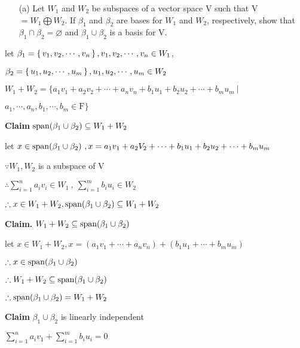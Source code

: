 \begin{enumerate}
	\item[(a)] Let $W_1$ and $W_2$ be subspaces of a vector space V such that V $= W_1 \bigoplus W_2$. If $\beta_{1}$ and $\beta_{2}$ are bases for $W_1$ and $W_2$, respectively, show that $\beta_1 \cap \beta_2 = \varnothing$ and $\beta_1 \cup \beta_2$ is a basis for V.
\end{enumerate}

\begin{tcolorbox}
	\begin{solution}
		let $\beta_1 = \left\{ \,v_1,v_2,\cdots,v_n \,\right\},v_1,v_2,\cdots,v_n \in W_1$,
		
		 $\beta_2 = \left\{ \,u_1,u_2,\cdots,u_m \,\right\},u_1,u_2,\cdots,u_m \in W_2$
		
		$W_1 + W_2 = \{a_1v_1+a_2v_2+\cdots+a_nv_n+b_1u_1+b_2u_2+\cdots+b_mu_m ~|~  $ 
		
		$a_1,\cdots,a_n,b_1,\cdots,b_m \in \mathrm{F}\} $
		
		\textbf{Claim} $\text{span($\beta_1 \cup \beta_2$)} \subseteq W_1 + W_2$
		
		let $x \in \text{span($\beta_1 \cup \beta_2$)}~, x = a_1v_1 + a_2V_2 + \cdots + b_1u_1 + b_2u_2 + \cdots + b_mu_m$
		
		$\because W_1,W_2$ is a subspace of V
		
		$\therefore \sum^{n}_{i=1}a_iv_i \in W_1~,~ \sum^{m}_{i=1}b_iu_i \in W_2$
		
		$\therefore x \in W_1 + W_2,\text{span($\beta_1 \cup \beta_2$)} \subseteq W_1 + W_2$
		
		\textbf{Claim.} $W_1 + W_2 \subseteq \text{span($\beta_1 \cup \beta_2$)}$
		
		let $x \in W_1 + W_2, x = (a_1v_1 + \cdots + a_nv_n) + (b_1u_1 + \cdots  + b_mu_m)$
		
		$\therefore x \in \text{span($\beta_1 \cup \beta_2$)}$
		
		$\therefore W_1 + W_2 \subseteq \text{span($\beta_1 \cup \beta_2$)}$
		
		$\therefore \text{span($\beta_1 \cup \beta_2$)} = W_1 + W_2$


		\textbf{Claim} ${\beta_1 \cup \beta_2}$ is linearly independent
		
		$\sum^n_{i=1}a_iv_1 + \sum^m_{i=1}b_iu_i = 0$
		

\end{solution}
\end{tcolorbox}
